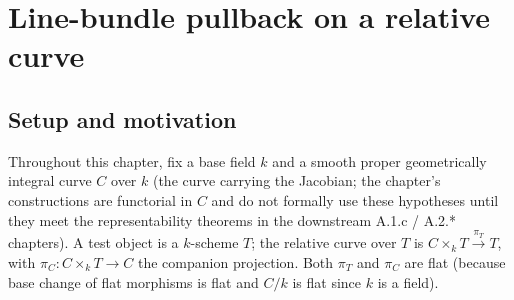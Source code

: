 \chapter{Line-bundle pullback on a relative curve}
\label{chap:Picard_LineBundlePullback}



\section{Setup and motivation}
\label{sec:lbp_setup}

Throughout this chapter, fix a base field \(k\) and a smooth proper geometrically
integral curve \(C\) over \(k\) (the curve carrying the Jacobian; the chapter's
constructions are functorial in \(C\) and do not formally use these hypotheses
until they meet the representability theorems in the downstream A.1.c / A.2.*
chapters). A test object is a \(k\)-scheme \(T\); the relative curve over \(T\) is
\(C \times_k T \xrightarrow{\pi_T} T\), with \(\pi_C : C \times_k T \to C\) the
companion projection. Both \(\pi_T\) and \(\pi_C\) are flat (because base change of
flat morphisms is flat and \(C/k\) is flat since \(k\) is a field).

